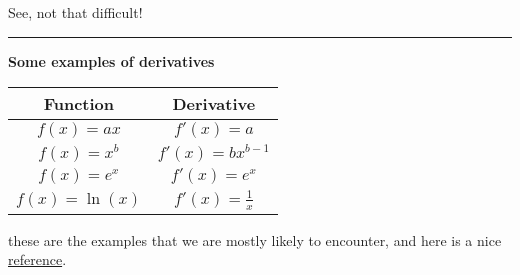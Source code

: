 \documentclass[twoside]{article}
\theoremstyle{definition}
\begin{document}
See, not that difficult!

\vspace{20pt}
\noindent\rule{\textwidth}{0.4pt}

\textbf{Some examples of derivatives}
\begin{table}[ht]
\centering
    \begin{tabular}{cc}
         Function & Derivative\\
        \hline
        $f(x)=ax$ & $f'(x)=a$\\
        $f(x)= x^b$ & $f'(x)=bx^{b-1}$\\
        $f(x) =e^x$ & $f'(x)=e^x$\\
        $f(x)=\ln(x)$ & $f'(x)=\frac{1}{x}$
    \end{tabular}
\end{table}

these are the examples that we are mostly likely to encounter, and here is a nice \href{https://www.mathsisfun.com/calculus/derivatives-rules.html}{reference}.

%
%
\end{document}
